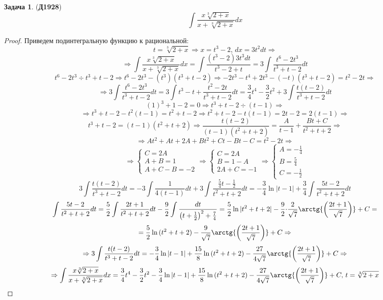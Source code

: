 \documentclass[12pt]{article}
\theoremstyle{definition}
\newtheorem{problem}{Задача}
\DeclareMathOperator{\dint}{\displaystyle\int}
\begin{document}
\begin{problem}(\textbf{Д1928})
	$$
		\dint \dfrac{x\sqrt[3]{2+x}}{x + \sqrt[3]{2 +x}}dx
	$$
\end{problem}
\begin{proof}
	Приведем подинтегральную функцию к рациональной:
	$$
		t =  \sqrt[3]{2+x} \Rightarrow x = t^3 - 2, \, dx = 3t^2dt \Rightarrow
	$$
	$$
		\Rightarrow \dint \dfrac{x\sqrt[3]{2+x}}{x + \sqrt[3]{2 +x}}dx = \dint \dfrac{(t^3 - 2)3t^3dt}{t^3 - 2 + t} = 3 \dint \dfrac{t^6 - 2t^3}{t^3 + t -2}dt
	$$
	$$
		t^6 - 2t^3 \div t^3 + t -2 \Rightarrow t^6 - 2t^3 - (t^3)(t^3 + t - 2) \Rightarrow -2t^3 -t^4 + 2t^3  - (-t)(t^3 + t - 2) = t^2 -2t \Rightarrow
	$$
	$$
		\Rightarrow 3 \dint \dfrac{t^6 - 2t^3}{t^3 + t -2}dt = 3 \dint t^3 -t + \dfrac{t^2 -2t}{t^3 + t - 2}dt = \dfrac{3}{4}t^4 - \dfrac{3}{2}t^2 + 3 \dint \dfrac{t(t-2)}{t^3 + t - 2}dt
	$$
	$$
		(1)^3 + 1 - 2 = 0 \Rightarrow t^3 + t - 2 \div (t-1) \Rightarrow
	$$
	$$
		\Rightarrow t^3 + t - 2 - t^2(t-1) = t^2 + t - 2 \Rightarrow t^2 + t - 2 -t(t-1) = 2t - 2 = 2(t-1) \Rightarrow 
	$$
	$$
		t^3 + t - 2 = (t-1)(t^2 + t + 2) \Rightarrow \dfrac{t(t-2)}{(t-1)(t^2 + t + 2)} = \dfrac{A}{t-1} + \dfrac{Bt +C}{t^2 + t + 2} \Rightarrow
	$$
	$$
		\Rightarrow At^2 + At + 2A + Bt^2 + Ct - Bt - C = t^2 -2 t \Rightarrow 
	$$
	$$
		\Rightarrow
		\begin{cases}
			C = 2A\\
			A + B = 1\\
			A + C - B = -2
		\end{cases} \Rightarrow
		\begin{cases}
			C = 2A\\
			B = 1 - A\\
			2A + C= - 1
		\end{cases} \Rightarrow
		\begin{cases}
			A = -\tfrac{1}{4}\\
			B = \tfrac{5}{4} \\
			C= - \tfrac{1}{2}
		\end{cases}
	$$
	$$
		3 \dint \dfrac{t(t-2)}{t^3 + t - 2}dt = -3\dint \dfrac{1}{4(t-1)}dt + 3 \dint\dfrac{\tfrac{5}{4}t - \tfrac{1}{2}}{t^2 + t+ 2} dt = -\dfrac{3}{4}\ln{|t-1|} +  \dfrac{3}{4} \dint\dfrac{5t - 2}{t^2 + t+ 2} dt 
	$$
	$$
		 \dint\dfrac{5t - 2}{t^2 + t+ 2} dt = \dfrac{5}{2}\dint \dfrac{2t + 1}{t^2 + t + 2}dt - \dfrac{9}{2}\dint \dfrac{dt}{\left(t + \tfrac{1}{2}\right)^2 + \tfrac{7}{4}} = \dfrac{5}{2}\ln{|t^2 + t +2|}  -\dfrac{9}{2}{\cdot}\dfrac{2}{\sqrt{7}}\arctg{\left(\dfrac{2t + 1}{\sqrt{7}}\right)} + C =
	$$
	$$
		= \dfrac{5}{2}\ln{(t^2 + t +2)}  -\dfrac{9}{\sqrt{7}}\arctg{\left(\dfrac{2t + 1}{\sqrt{7}}\right)} + C \Rightarrow
	$$ 
	$$
		\Rightarrow 3 \dint \dfrac{t(t-2)}{t^3 + t - 2}dt = -\dfrac{3}{4}\ln{|t-1|} +\dfrac{15}{8}\ln{(t^2 + t +2)}  -\dfrac{27}{4\sqrt{7}}\arctg{\left(\dfrac{2t + 1}{\sqrt{7}}\right)} + C \Rightarrow
	$$
	$$
		\Rightarrow \dint \dfrac{x\sqrt[3]{2+x}}{x + \sqrt[3]{2 +x}}dx = \dfrac{3}{4}t^4 - \dfrac{3}{2}t^2 -\dfrac{3}{4}\ln{|t-1|} +\dfrac{15}{8}\ln{(t^2 + t +2)}  -\dfrac{27}{4\sqrt{7}}\arctg{\left(\dfrac{2t + 1}{\sqrt{7}}\right)} + C, \, t =\sqrt[3]{2 + x}
	$$
\end{proof}
\end{document}
